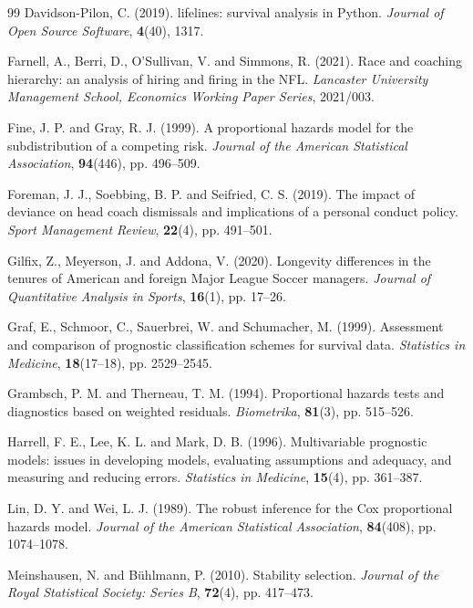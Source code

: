 \documentclass[USenglish]{article}
\theoremstyle{dgthm}
\theoremstyle{dgdef}
\begin{document}
\begin{thebibliography}{99}
Davidson-Pilon, C. (2019). lifelines: survival analysis in Python. \emph{Journal of Open Source Software}, \textbf{4}(40), 1317.

Farnell, A., Berri, D., O'Sullivan, V. and Simmons, R. (2021). Race and coaching hierarchy: an analysis of hiring and firing in the NFL. \emph{Lancaster University Management School, Economics Working Paper Series}, 2021/003.

Fine, J. P. and Gray, R. J. (1999). A proportional hazards model for the subdistribution of a competing risk. \emph{Journal of the American Statistical Association}, \textbf{94}(446), pp. 496--509.

Foreman, J. J., Soebbing, B. P. and Seifried, C. S. (2019). The impact of deviance on head coach dismissals and implications of a personal conduct policy. \emph{Sport Management Review}, \textbf{22}(4), pp. 491--501.

Gilfix, Z., Meyerson, J. and Addona, V. (2020). Longevity differences in the tenures of American and foreign Major League Soccer managers. \emph{Journal of Quantitative Analysis in Sports}, \textbf{16}(1), pp. 17--26.

Graf, E., Schmoor, C., Sauerbrei, W. and Schumacher, M. (1999). Assessment and comparison of prognostic classification schemes for survival data. \emph{Statistics in Medicine}, \textbf{18}(17--18), pp. 2529--2545.

Grambsch, P. M. and Therneau, T. M. (1994). Proportional hazards tests and diagnostics based on weighted residuals. \emph{Biometrika}, \textbf{81}(3), pp. 515--526.

Harrell, F. E., Lee, K. L. and Mark, D. B. (1996). Multivariable prognostic models: issues in developing models, evaluating assumptions and adequacy, and measuring and reducing errors. \emph{Statistics in Medicine}, \textbf{15}(4), pp. 361--387.

Lin, D. Y. and Wei, L. J. (1989). The robust inference for the Cox proportional hazards model. \emph{Journal of the American Statistical Association}, \textbf{84}(408), pp. 1074--1078.

Meinshausen, N. and B\"uhlmann, P. (2010). Stability selection. \emph{Journal of the Royal Statistical Society: Series B}, \textbf{72}(4), pp. 417--473.


\end{thebibliography}
\end{document}
